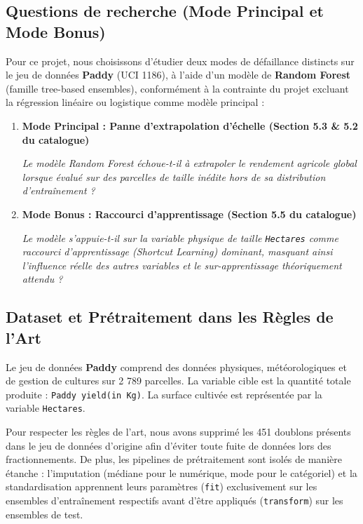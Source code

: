 \documentclass[11pt,a4paper]{article}
\begin{document}
\subsection{Questions de recherche (Mode Principal et Mode Bonus)}
Pour ce projet, nous choisissons d'étudier deux modes de défaillance distincts sur le jeu de données \textbf{Paddy} (UCI 1186), à l'aide d'un modèle de \textbf{Random Forest} (famille tree-based ensembles), conformément à la contrainte du projet excluant la régression linéaire ou logistique comme modèle principal :
\begin{enumerate}
    \item \textbf{Mode Principal : Panne d'extrapolation d'échelle (Section 5.3 \& 5.2 du catalogue)}
    \begin{center}
    \textit{Le modèle Random Forest échoue-t-il à extrapoler le rendement agricole global lorsque évalué sur des parcelles de taille inédite hors de sa distribution d'entraînement ?}
    \end{center}
    \item \textbf{Mode Bonus : Raccourci d'apprentissage (Section 5.5 du catalogue)}
    \begin{center}
    \textit{Le modèle s'appuie-t-il sur la variable physique de taille \texttt{Hectares} comme raccourci d'apprentissage (Shortcut Learning) dominant, masquant ainsi l'influence réelle des autres variables et le sur-apprentissage théoriquement attendu ?}
    \end{center}
\end{enumerate}

\subsection{Dataset et Prétraitement dans les Règles de l'Art}
Le jeu de données \textbf{Paddy} comprend des données physiques, météorologiques et de gestion de cultures sur 2 789 parcelles. La variable cible est la quantité totale produite : \texttt{Paddy yield(in Kg)}. La surface cultivée est représentée par la variable \texttt{Hectares}.

Pour respecter les règles de l'art, nous avons supprimé les 451 doublons présents dans le jeu de données d'origine afin d'éviter toute fuite de données lors des fractionnements. De plus, les pipelines de prétraitement sont isolés de manière étanche : l'imputation (médiane pour le numérique, mode pour le catégoriel) et la standardisation apprennent leurs paramètres (\texttt{fit}) exclusivement sur les ensembles d'entraînement respectifs avant d'être appliqués (\texttt{transform}) sur les ensembles de test.
\end{document}
